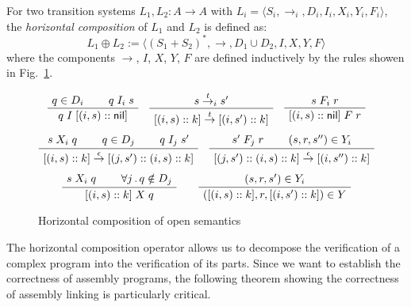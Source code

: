 \documentclass[sigplan,10pt,review,anonymous]{acmart}
\newcommand{\kw}[1]{\ensuremath{ \mathsf{#1} }}
\begin{document}
\begin{definition} \label{def:hcomp} %
For two transition systems $L_1, L_2 : A \rightarrow A$
with
$L_i = \langle S_i, {\rightarrow}_i, D_i, I_i, X_i, Y_i, F_i \rangle$,
the \emph{horizontal composition} of $L_1$ and $L_2$
is defined as:
\[
    L_1 \oplus L_2 :=
    \langle
      (S_1 + S_2)^*, {\rightarrow}, D_1 \cup D_2, I, X, Y, F
    \rangle
\]
where the components $\rightarrow$, $I$, $X$, $Y$, $F$
are defined inductively by 
the rules showen in Fig.~\ref{fig:hcomp}.
\end{definition}

\begin{figure} %
    \footnotesize
    \begin{gather*}
        \AxiomC{$q \in D_i$}
        \AxiomC{$q \mathrel{I_i} s$}
        \BinaryInfC{$q \mathrel{I} [(i, s) :: \kw{nil}]$}
        \DisplayProof
        \quad
        \AxiomC{$s \stackrel{t}{\rightarrow}_i s'$}
        \UnaryInfC{$
            [(i, s) :: k]
            \stackrel{t}{\rightarrow}
            [(i, s') :: k]$}
        \DisplayProof
        \quad
        \AxiomC{$s \mathrel{F_i} r$}
        \UnaryInfC{$[(i, s) :: \kw{nil}] \mathrel{F} r$}
        \DisplayProof
        \\[1ex]
        \AxiomC{$s \mathrel{X_i} q$}
        \AxiomC{$q \in D_j$}
        \AxiomC{$q \mathrel{I_j} s'$}
        \TrinaryInfC{$
            [(i, s) :: k]
            \stackrel{\epsilon}{\rightarrow}
            [(j, s') :: (i, s) :: k]$}
        \DisplayProof
        \quad
        \AxiomC{$s' \mathrel{F_j} r$}
        \AxiomC{$(s, r, s'') \in Y_i$}
        \BinaryInfC{$
            [(j, s') :: (i, s) :: k]
            \stackrel{\epsilon}{\rightarrow}
            [(i, s'') :: k]$}
        \DisplayProof
        \\[1ex]
        \AxiomC{$s \mathrel{X_i} q$}
        \AxiomC{$\forall j \,.\, q \notin D_j$}
        \BinaryInfC{$[(i, s) :: k] \mathrel{X} q$}
        \DisplayProof
        \qquad
        \AxiomC{$(s, r, s') \in Y_i$}
        \UnaryInfC{$([(i, s) :: k], r, [(i, s') :: k]) \in Y$}
        \DisplayProof
    \end{gather*}
    \caption{Horizontal composition of open semantics}
    \label{fig:hcomp}
\end{figure}

The horizontal composition operator
allows us to decompose the verification of a complex program
into the verification of its parts.
Since we want to
establish the correctness of assembly programs,
the following theorem showing the correctness
of assembly linking is particularly critical.
\end{document}

